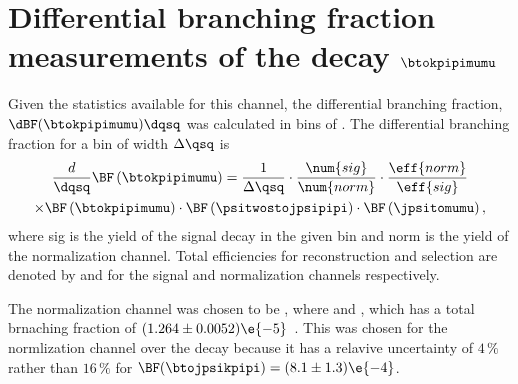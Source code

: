 \section{Differential branching fraction measurements of the decay $\boldsymbol{\btokpipimumu}$}

Given the statistics available for this channel, the differential branching fraction,
$\dBF(\btokpipimumu)\dqsq$ was calculated in bins of \qsq.
The differential branching fraction for a bin of width $\Delta\qsq$ is
\begin{multline}
  \frac{d}{\dqsq}\BF\left(\btokpipimumu\right)
  =
  \frac{1}{\Delta\qsq} \cdot
  \frac{\num{sig}}{\num{norm}} \cdot
  \frac{\eff{norm}}{\eff{sig}} \\
  \times\BF\left(\btokpipimumu\right) \cdot
  \BF\left(\psitwostojpsipipi\right) \cdot
  \BF\left(\jpsitomumu\right),
\end{multline}
where \num{sig} is the yield of the signal decay \btokpipimumu in the given \qsq bin and \num{norm}
is the yield of the normalization channel.
Total efficiencies for reconstruction and selection are denoted by  and  for the
signal and normalization channels respectively.

The normalization channel was chosen to be \btopsitwosk, where \psitwostojpsipipi and \jpsitomumu,
which has a total brnaching fraction of $(1.264 \pm 0.0052)\e{-5}$~\cite{PDG2012}.
This was chosen for the normlization channel over the decay \btojpsikpipi because it has a relavive
uncertainty of $4\,\%$ rather than $16\,\%$ for $\BF(\btojpsikpipi) = (8.1\pm1.3)\e{-4}$.















